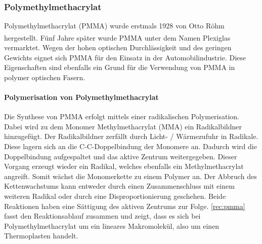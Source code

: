 \subsubsection{Polymethylmethacrylat}
\label{subsec:pofpmma}

Polymethylmethacrylat (PMMA) wurde erstmals 1928 von Otto Röhm hergestellt. Fünf
Jahre später wurde PMMA unter dem Namen
Plexiglas\textsuperscript{\textregistered} vermarktet. Wegen der hohen optischen
Durchlässigkeit und des geringen Gewichts eignet sich PMMA für den Einsatz in
der Automobilindustrie. Diese Eigenschaften sind ebenfalls ein Grund für die
Verwendung von PMMA in polymer optischen Fasern. \cite{pofwuppmma}

\paragraph{Polymerisation von Polymethylmethacrylat} Die Synthese von PMMA
erfolgt mittels einer radikalischen Polymerisation. Dabei wird zu dem Monomer
Methylmethacrylat (MMA) ein Radikalbildner hinzugefügt. Der Radikalbildner
zerfällt durch Licht- / Wärmezufuhr in Radikale. Diese lagern sich an die
C-C-Doppelbindung der Monomere an. Dadurch wird die Doppelbindung aufgespaltet
und das aktive Zentrum weitergegeben. Dieser Vorgang erzeugt wieder ein Radikal,
welches ebenfalls ein Methylmethacrylat angreift. Somit wächst die Monomerkette
zu einem Polymer an. Der Abbruch des Kettenwachstums kann entweder durch einen
Zusammenschluss mit einem weiteren Radikal oder durch eine Disproportionierung
geschehen. Beide Reaktionen haben eine Sättigung des aktiven Zentrums zur Folge.
\autoref{rec:pmma} fasst den Reaktionsablauf zusammen und zeigt, dass es sich
bei Polymethylmethacrylat um ein lineares Makromolekül, also um einen
Thermoplasten handelt.


